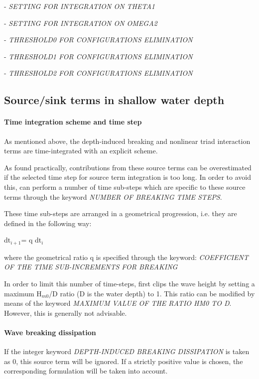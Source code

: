 - \textit{SETTING FOR INTEGRATION ON THETA1}

- \textit{SETTING FOR INTEGRATION ON OMEGA2}

- \textit{THRESHOLD0 FOR CONFIGURATIONS ELIMINATION}

- \textit{THRESHOLD1 FOR CONFIGURATIONS ELIMINATION}

- \textit{THRESHOLD2 FOR CONFIGURATIONS ELIMINATION}


\subsection{ Source/sink terms in shallow water depth}
\label{se:sourcshallow}

\paragraph{ Time integration scheme and time step}

 As mentioned above, the depth-induced breaking and nonlinear triad interaction terms are time-integrated with an explicit scheme.

 As found practically, contributions from these source terms can be overestimated if the selected time step for source term integration
 is too long. In order to avoid this, \tomawac can perform a number of time sub-steps which are specific to these source terms through
 the keyword \textit{NUMBER OF BREAKING TIME STEPS}.

 These time sub-steps are arranged in a geometrical progression, i.e. they are defined in the following way:

dt${}_{i+1 }$= q dt${}_{i}$

 where the geometrical ratio q is specified through the keyword: \textit{COEFFICIENT OF THE TIME SUB-INCREMENTS FOR BREAKING}

 In order to limit this number of time-steps, \tomawac first clips the wave height by setting a maximum H${}_{m0}$/D ratio (D is the
 water depth) to 1. This ratio can be modified by means of the keyword \textit{MAXIMUM VALUE OF THE RATIO HM0 TO D}. However, this is
 generally not advisable.


\paragraph{ Wave breaking dissipation}

If the integer keyword \textit{DEPTH-INDUCED BREAKING DISSIPATION} is taken as 0, this source term will be ignored. If a strictly
positive value is chosen, the corresponding formulation will be taken into account.


